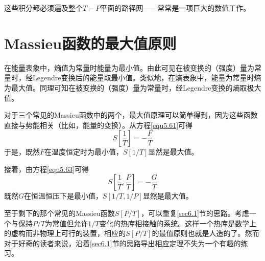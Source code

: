 这些积分都必须遍及整个$T-P$平面的路径网——常常是一项巨大的数值工作。

\section{Massieu函数的最大值原则}
\label{sec6.7}
在能量表象中，熵值为常量时能量为最小值。由此可见在被变换的（强度）量为常量时，经Legendre变换后的能量取最小值。类似地，在熵表象中，能量为常量时熵为最大值。同理可知在被变换的（强度）量为常量时，经Legendre变换的熵取极大值。%

对于三个常见的Massieu函数中的两个，最大值原理可以简单得到，因为这些函数直接与势能相关（比如，能量的变换）。从方程\eqref{equ5.61}可得
\begin{equation}
	S\left[\frac{1}{T}\right]=-\frac{F}{T}
\end{equation}
于是，既然$F$在温度恒定时为最小值，$S[1/T]$显然是最大值。

接着，由方程\eqref{equ5.63}可得
\begin{equation}
	S\left[\frac{1}{T},\frac{P}{T}\right]=-\frac{G}{T}
\end{equation}
既然$G$在恒温恒压下是最小值，$S[1/T,1/P]$显然是最大值。

至于剩下的那个常见的Massieu函数$S[P/T]$，可以重复\ref{sec6.1}节的思路。考虑一个与保持$P/T$为常值但允许$1/T$变化的热库相接触的系统。这样一个热库是数学上的虚构而非物理上可行的装置，相应的$S[P/T]$的最值原则也就是人造的了。然而对于好奇的读者来说，沿着\ref{sec6.1}节的思路导出相应定理不失为一个有趣的练习。